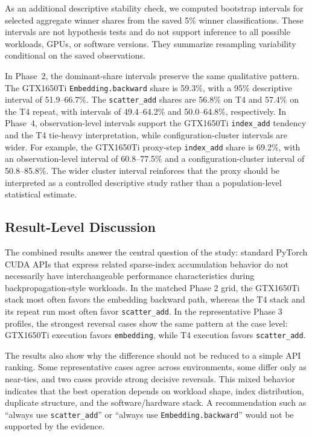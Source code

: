 

As an additional descriptive stability check, we computed bootstrap intervals for selected aggregate winner shares from the saved 5\% winner classifications. These intervals are not hypothesis tests and do not support inference to all possible workloads, GPUs, or software versions. They summarize resampling variability conditional on the saved observations.

In Phase~2, the dominant-share intervals preserve the same qualitative pattern. The GTX1650Ti \texttt{Embedding.\allowbreak backward} share is 59.3\%, with a 95\% descriptive interval of 51.9--66.7\%. The \texttt{scatter\_\allowbreak add} shares are 56.8\% on T4 and 57.4\% on the T4 repeat, with intervals of 49.4--64.2\% and 50.0--64.8\%, respectively. In Phase~4, observation-level intervals support the GTX1650Ti \texttt{index\_\allowbreak add} tendency and the T4 tie-heavy interpretation, while configuration-cluster intervals are wider. For example, the GTX1650Ti proxy-step \texttt{index\_\allowbreak add} share is 69.2\%, with an observation-level interval of 60.8--77.5\% and a configuration-cluster interval of 50.8--85.8\%. The wider cluster interval reinforces that the proxy should be interpreted as a controlled descriptive study rather than a population-level statistical estimate.

\subsection{Result-Level Discussion}

The combined results answer the central question of the study: standard PyTorch CUDA APIs that express related sparse-index accumulation behavior do not necessarily have interchangeable performance characteristics during backpropagation-style workloads. In the matched Phase 2 grid, the GTX1650Ti stack most often favors the embedding backward path, whereas the T4 stack and its repeat run most often favor \texttt{scatter\_\allowbreak add}. In the representative Phase 3 profiles, the strongest reversal cases show the same pattern at the case level: GTX1650Ti execution favors \texttt{embedding}, while T4 execution favors \texttt{scatter\_\allowbreak add}.

The results also show why the difference should not be reduced to a simple API ranking. Some representative cases agree across environments, some differ only as near-ties, and two cases provide strong decisive reversals. This mixed behavior indicates that the best operation depends on workload shape, index distribution, duplicate structure, and the software/hardware stack. A recommendation such as ``always use \texttt{scatter\_\allowbreak add}'' or ``always use \texttt{Embedding.\allowbreak backward}'' would not be supported by the evidence.

